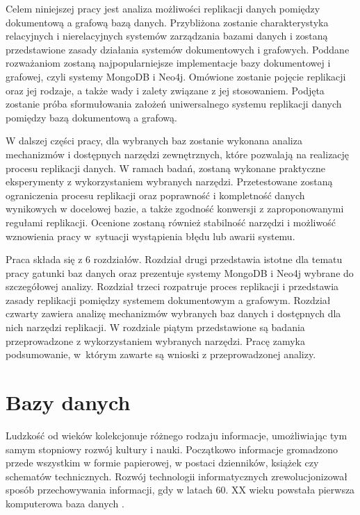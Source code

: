 \documentclass[a4paper,twoside,12pt]{book}
\begin{document}
Celem niniejszej pracy jest analiza możliwości replikacji danych pomiędzy dokumentową a grafową bazą danych. Przybliżona zostanie charakterystyka relacyjnych i nierelacyjnych systemów zarządzania bazami danych i zostaną przedstawione zasady działania systemów dokumentowych i grafowych. Poddane rozważaniom zostaną najpopularniejsze implementacje bazy dokumentowej i grafowej, czyli systemy MongoDB i Neo4j. Omówione zostanie pojęcie replikacji oraz jej rodzaje, a także wady i zalety związane z jej stosowaniem. Podjęta zostanie próba sformułowania założeń uniwersalnego systemu replikacji danych pomiędzy bazą dokumentową a grafową.

W dalszej części pracy, dla wybranych baz zostanie wykonana analiza mechanizmów i dostępnych narzędzi zewnętrznych, które pozwalają na realizację procesu replikacji danych. W ramach badań, zostaną wykonane praktyczne eksperymenty z wykorzystaniem wybranych narzędzi. Przetestowane zostaną ograniczenia procesu replikacji oraz poprawność i kompletność danych wynikowych w docelowej bazie, a także zgodność konwersji z zaproponowanymi regułami replikacji. Ocenione zostaną również stabilność narzędzi i możliwość wznowienia pracy w~sytuacji wystąpienia błędu lub awarii systemu. 

Praca składa się z 6 rozdziałów. Rozdział drugi przedstawia istotne dla tematu pracy gatunki baz danych oraz prezentuje systemy MongoDB i Neo4j wybrane do szczegółowej analizy. Rozdział trzeci rozpatruje proces replikacji i przedstawia zasady replikacji pomiędzy systemem dokumentowym a grafowym. Rozdział czwarty zawiera analizę mechanizmów wybranych baz danych i dostępnych dla nich narzędzi replikacji. W rozdziale piątym przedstawione są badania przeprowadzone z wykorzystaniem wybranych narzędzi. Pracę zamyka podsumowanie, w~którym zawarte są wnioski z przeprowadzonej analizy.

\chapter{Bazy danych} 

Ludzkość od wieków kolekcjonuje różnego rodzaju informacje, umożliwiając tym samym stopniowy rozwój kultury i nauki. Początkowo informacje gromadzono przede wszystkim w formie papierowej, w postaci dzienników, książek czy schematów technicznych. Rozwój technologii informatycznych zrewolucjonizował sposób przechowywania informacji, gdy w latach 60. XX wieku powstała pierwsza komputerowa baza danych \cite{bib:an-introduction-to-database-systems}.
\end{document}
